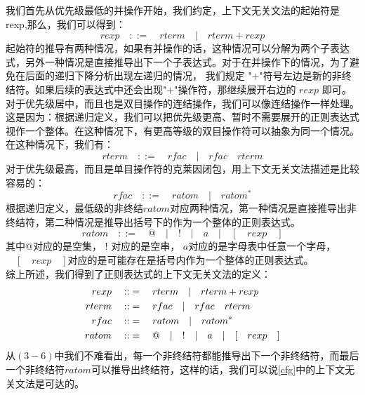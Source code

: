 \documentclass[openany,oneside]{book}
\theoremstyle{definition}
\theoremstyle{definition}
\begin{document}
	我们首先从优先级最低的并操作开始，我们约定，上下文无关文法的起始符是rexp,那么，我们可以得到：
	\begin{equation}
		rexp \quad::=\quad rterm\quad  | \quad rterm + rexp
	\end{equation}
	\indent 起始符的推导有两种情况，如果有并操作的话，这种情况可以分解为两个子表达式，另外一种情况是直接推导出下一个子表达式。对于在并操作下的情况，为了避免在后面的递归下降分析出现左递归的情况， 我们规定 "$+$"符号左边是新的非终结符。如果后续的表达式中还会出现"$+$"操作符，那继续展开右边的 $rexp$ 即可。\\
	\indent 对于优先级居中，而且也是双目操作的连结操作，我们可以像连结操作一样处理。这是因为：根据递归定义，我们可以把优先级更高、暂时不需要展开的正则表达式视作一个整体。在这种情况下，有更高等级的双目操作符可以抽象为同一个情况。在这种情况下，我们有：
	\begin{equation}
		rterm\quad::=\quad rfac\quad | \quad rfac\quad rterm
	\end{equation}
	\indent 对于优先级最高，而且是单目操作符的克莱因闭包，用上下文无关文法描述是比较容易的：
	\begin{equation}
		rfac\quad::=\quad ratom \quad | \quad ratom^* 
	\end{equation}
	\indent 根据递归定义，最低级的非终结$ratom$对应两种情况，第一种情况是直接推导出非终结符，第二种情况是推导出括号下的作为一个整体的正则表达式。
	\begin{equation}
		ratom\quad::=\quad @ \quad | \quad ! \quad |\quad a \quad | \quad[\quad rexp \quad]
	\end{equation}
	\indent 其中$@$对应的是空集， $!$ 对应的是空串， $a$对应的是字母表中任意一个字母， $\quad[\quad rexp \quad]$对应的是可能存在是括号内作为一个整体的正则表达式。 \\
	\indent 综上所述，我们得到了正则表达式的上下文无关文法的定义：
	\begin{equation}\label{cfg}
		\begin{split}
			rexp \quad::&=\quad rterm\quad  | \quad rterm + rexp \hfill  \\
			rterm\quad::&=\quad rfac\quad | \quad rfac\quad rterm \hfill  \\
			rfac\quad::&=\quad ratom \quad | \quad ratom^* \hfill \\
			ratom\quad::&=\quad @ \quad | \quad ! \quad |\quad a \quad | \quad[\quad rexp \quad] \hfill 
		\end{split}
	\end{equation}
	\indent 从\(\left( 3-6\right) \)中我们不难看出，每一个非终结符都能推导出下一个非终结符，而最后一个非终结符$ratom$可以推导出终结符，这样的话，我们可以说\ref{cfg}中的上下文无关文法是可达的。
	
\end{document}

